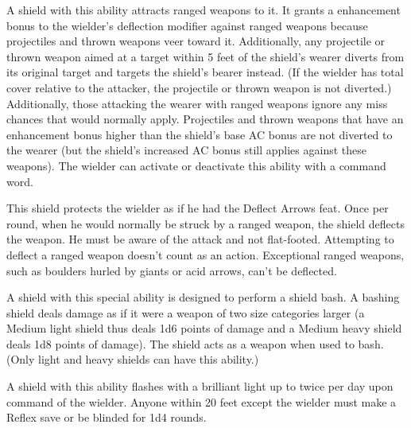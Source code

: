 
 A shield with this ability attracts ranged weapons to it. It grants a  enhancement bonus to the wielder's deflection modifier against ranged weapons because projectiles and thrown weapons veer toward it. Additionally, any projectile or thrown weapon aimed at a target within 5 feet of the shield's wearer diverts from its original target and targets the shield's bearer instead. (If the wielder has total cover relative to the attacker, the projectile or thrown weapon is not diverted.) Additionally, those attacking the wearer with ranged weapons ignore any miss chances that would normally apply. Projectiles and thrown weapons that have an enhancement bonus higher than the shield's base AC bonus are not diverted to the wearer (but the shield's increased AC bonus still applies against these weapons). The wielder can activate or deactivate this ability with a command word.


 This shield protects the wielder as if he had the Deflect Arrows feat. Once per round, when he would normally be struck by a ranged weapon, the shield deflects the weapon. He must be aware of the attack and not flat-footed. Attempting to deflect a ranged weapon doesn't count as an action. Exceptional ranged weapons, such as boulders hurled by giants or acid arrows, can't be deflected.


 A shield with this special ability is designed to perform a shield bash. A bashing shield deals damage as if it were a weapon of two size categories larger (a Medium light shield thus deals 1d6 points of damage and a Medium heavy shield deals 1d8 points of damage). The shield acts as a  weapon when used to bash. (Only light and heavy shields can have this ability.)


 A shield with this ability flashes with a brilliant light up to twice per day upon command of the wielder. Anyone within 20 feet except the wielder must make a Reflex save or be blinded for 1d4 rounds.

